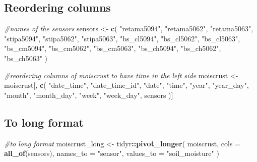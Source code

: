 \documentclass[]{article}
\newenvironment{Shaded}{\begin{snugshade}}{\end{snugshade}}
\newcommand{\CommentTok}[1]{\textcolor[rgb]{0.56,0.35,0.01}{\textit{#1}}}
\newcommand{\DataTypeTok}[1]{\textcolor[rgb]{0.13,0.29,0.53}{#1}}
\newcommand{\KeywordTok}[1]{\textcolor[rgb]{0.13,0.29,0.53}{\textbf{#1}}}
\newcommand{\NormalTok}[1]{#1}
\newcommand{\OperatorTok}[1]{\textcolor[rgb]{0.81,0.36,0.00}{\textbf{#1}}}
\newcommand{\StringTok}[1]{\textcolor[rgb]{0.31,0.60,0.02}{#1}}
\begin{document}
\hypertarget{reordering-columns}{%
\subsection{Reordering columns}\label{reordering-columns}}

\begin{Shaded}
\begin{Highlighting}[]
\CommentTok{#names of the sensors}
\NormalTok{sensors <-}\StringTok{ }\KeywordTok{c}\NormalTok{(}
  \StringTok{"retama5094"}\NormalTok{,}
  \StringTok{"retama5062"}\NormalTok{,}
  \StringTok{"retama5063"}\NormalTok{,}
  \StringTok{"stipa5094"}\NormalTok{,}
  \StringTok{"stipa5062"}\NormalTok{,}
  \StringTok{"stipa5063"}\NormalTok{,}
  \StringTok{"bs_cl5094"}\NormalTok{,}
  \StringTok{"bs_cl5062"}\NormalTok{,}
  \StringTok{"bs_cl5063"}\NormalTok{,}
  \StringTok{"bs_cm5094"}\NormalTok{,}
  \StringTok{"bs_cm5062"}\NormalTok{,}
  \StringTok{"bs_cm5063"}\NormalTok{,}
  \StringTok{"bs_ch5094"}\NormalTok{,}
  \StringTok{"bs_ch5062"}\NormalTok{,}
  \StringTok{"bs_ch5063"}
\NormalTok{)}

\CommentTok{#reordering columns of moiscrust to have time in the left side}
\NormalTok{moiscrust <-}\StringTok{ }\NormalTok{moiscrust[, }\KeywordTok{c}\NormalTok{(}
  \StringTok{"date_time"}\NormalTok{,}
  \StringTok{"date_time_id"}\NormalTok{,}
  \StringTok{"date"}\NormalTok{,}
  \StringTok{"time"}\NormalTok{,}
  \StringTok{"year"}\NormalTok{,}
  \StringTok{"year_day"}\NormalTok{,}
  \StringTok{"month"}\NormalTok{,}
  \StringTok{"month_day"}\NormalTok{,}
  \StringTok{"week"}\NormalTok{,}
  \StringTok{"week_day"}\NormalTok{,}
\NormalTok{  sensors}
\NormalTok{)]}
\end{Highlighting}
\end{Shaded}

\hypertarget{to-long-format}{%
\subsection{To long format}\label{to-long-format}}

\begin{Shaded}
\begin{Highlighting}[]
\CommentTok{#to long format}
\NormalTok{moiscrust_long <-}\StringTok{ }\NormalTok{tidyr}\OperatorTok{::}\KeywordTok{pivot_longer}\NormalTok{(}
\NormalTok{  moiscrust,}
  \DataTypeTok{cols =} \KeywordTok{all_of}\NormalTok{(sensors),}
  \DataTypeTok{names_to =} \StringTok{"sensor"}\NormalTok{,}
  \DataTypeTok{values_to =} \StringTok{"soil_moisture"}
\NormalTok{)}
\end{Highlighting}
\end{Shaded}
\end{document}
